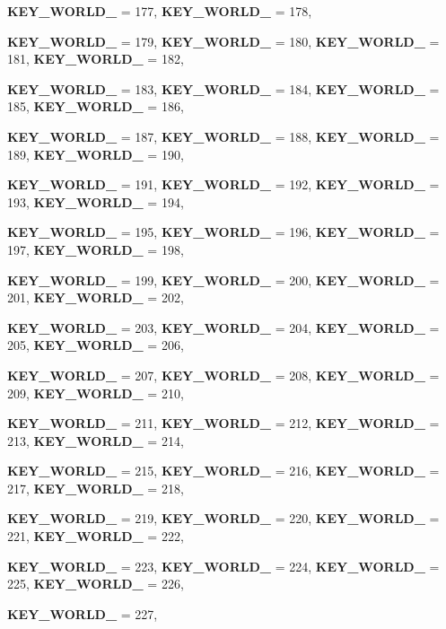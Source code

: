 \begin{DoxyCompactItemize}
{\bfseries KEY\_\-WORLD\_} =  177, 
{\bfseries KEY\_\-WORLD\_} =  178, 
\par
{\bfseries KEY\_\-WORLD\_} =  179, 
{\bfseries KEY\_\-WORLD\_} =  180, 
{\bfseries KEY\_\-WORLD\_} =  181, 
{\bfseries KEY\_\-WORLD\_} =  182, 
\par
{\bfseries KEY\_\-WORLD\_} =  183, 
{\bfseries KEY\_\-WORLD\_} =  184, 
{\bfseries KEY\_\-WORLD\_} =  185, 
{\bfseries KEY\_\-WORLD\_} =  186, 
\par
{\bfseries KEY\_\-WORLD\_} =  187, 
{\bfseries KEY\_\-WORLD\_} =  188, 
{\bfseries KEY\_\-WORLD\_} =  189, 
{\bfseries KEY\_\-WORLD\_} =  190, 
\par
{\bfseries KEY\_\-WORLD\_} =  191, 
{\bfseries KEY\_\-WORLD\_} =  192, 
{\bfseries KEY\_\-WORLD\_} =  193, 
{\bfseries KEY\_\-WORLD\_} =  194, 
\par
{\bfseries KEY\_\-WORLD\_} =  195, 
{\bfseries KEY\_\-WORLD\_} =  196, 
{\bfseries KEY\_\-WORLD\_} =  197, 
{\bfseries KEY\_\-WORLD\_} =  198, 
\par
{\bfseries KEY\_\-WORLD\_} =  199, 
{\bfseries KEY\_\-WORLD\_} =  200, 
{\bfseries KEY\_\-WORLD\_} =  201, 
{\bfseries KEY\_\-WORLD\_} =  202, 
\par
{\bfseries KEY\_\-WORLD\_} =  203, 
{\bfseries KEY\_\-WORLD\_} =  204, 
{\bfseries KEY\_\-WORLD\_} =  205, 
{\bfseries KEY\_\-WORLD\_} =  206, 
\par
{\bfseries KEY\_\-WORLD\_} =  207, 
{\bfseries KEY\_\-WORLD\_} =  208, 
{\bfseries KEY\_\-WORLD\_} =  209, 
{\bfseries KEY\_\-WORLD\_} =  210, 
\par
{\bfseries KEY\_\-WORLD\_} =  211, 
{\bfseries KEY\_\-WORLD\_} =  212, 
{\bfseries KEY\_\-WORLD\_} =  213, 
{\bfseries KEY\_\-WORLD\_} =  214, 
\par
{\bfseries KEY\_\-WORLD\_} =  215, 
{\bfseries KEY\_\-WORLD\_} =  216, 
{\bfseries KEY\_\-WORLD\_} =  217, 
{\bfseries KEY\_\-WORLD\_} =  218, 
\par
{\bfseries KEY\_\-WORLD\_} =  219, 
{\bfseries KEY\_\-WORLD\_} =  220, 
{\bfseries KEY\_\-WORLD\_} =  221, 
{\bfseries KEY\_\-WORLD\_} =  222, 
\par
{\bfseries KEY\_\-WORLD\_} =  223, 
{\bfseries KEY\_\-WORLD\_} =  224, 
{\bfseries KEY\_\-WORLD\_} =  225, 
{\bfseries KEY\_\-WORLD\_} =  226, 
\par
{\bfseries KEY\_\-WORLD\_} =  227, 

\end{DoxyCompactItemize}
